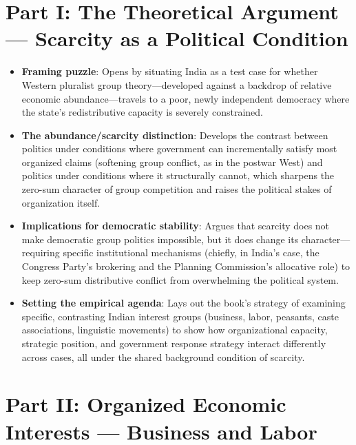 \documentclass[12pt]{article}
\begin{document}
\section{Part I: The Theoretical Argument --- Scarcity as a Political Condition}

\begin{itemize}[leftmargin=*, itemsep=4pt]
    \item \textbf{Framing puzzle}: Opens by situating India as a test case for whether Western pluralist group theory---developed against a backdrop of relative economic abundance---travels to a poor, newly independent democracy where the state's redistributive capacity is severely constrained.
    \item \textbf{The abundance/scarcity distinction}: Develops the contrast between politics under conditions where government can incrementally satisfy most organized claims (softening group conflict, as in the postwar West) and politics under conditions where it structurally cannot, which sharpens the zero-sum character of group competition and raises the political stakes of organization itself.
    \item \textbf{Implications for democratic stability}: Argues that scarcity does not make democratic group politics impossible, but it does change its character---requiring specific institutional mechanisms (chiefly, in India's case, the Congress Party's brokering and the Planning Commission's allocative role) to keep zero-sum distributive conflict from overwhelming the political system.
    \item \textbf{Setting the empirical agenda}: Lays out the book's strategy of examining specific, contrasting Indian interest groups (business, labor, peasants, caste associations, linguistic movements) to show how organizational capacity, strategic position, and government response strategy interact differently across cases, all under the shared background condition of scarcity.
\end{itemize}

\section{Part II: Organized Economic Interests --- Business and Labor}
\end{document}
